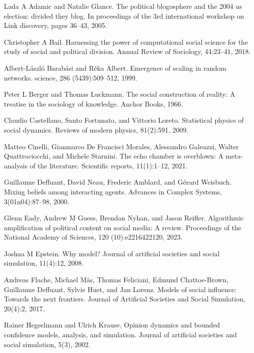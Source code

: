 \documentclass[11pt]{article}
\begin{document}
\begin{thebibliography}{23}

 Lada A Adamic and Natalie Glance. The political blogosphere and the 2004 us election: divided they blog. In proceedings of the 3rd international workshop on Link discovery, pages 36–43, 2005.

 Christopher A Bail. Harnessing the power of computational social science for the study of social and political division. Annual Review of Sociology, 44:23–41, 2018.

 Albert-L\'{a}szl\'{o} Barab\'{a}si and R\'{e}ka Albert. Emergence of scaling in random networks. science, 286 (5439):509–512, 1999.

 Peter L Berger and Thomas Luckmann. The social construction of reality: A treatise in the sociology of knowledge. Anchor Books, 1966.

 Claudio Castellano, Santo Fortunato, and Vittorio Loreto. Statistical physics of social dynamics. Reviews of modern physics, 81(2):591, 2009.

 Matteo Cinelli, Gianmarco De Francisci Morales, Alessandro Galeazzi, Walter Quattrociocchi, and Michele Starnini. The echo chamber is overblown: A meta-analysis of the literature. Scientific reports, 11(1):1–12, 2021.

 Guillaume Deffuant, David Neau, Frederic Amblard, and G\'{e}rard Weisbuch. Mixing beliefs among interacting agents. Advances in Complex Systems, 3(01n04):87–98, 2000.

 Glenn Eady, Andrew M Guess, Brendan Nyhan, and Jason Reifler. Algorithmic amplification of political content on social media: A review. Proceedings of the National Academy of Sciences, 120 (10):e2216422120, 2023.

 Joshua M Epstein. Why model? Journal of artificial societies and social simulation, 11(4):12, 2008.

 Andreas Flache, Michael M\"{a}s, Thomas Feliciani, Edmund Chattoe-Brown, Guillaume Deffuant, Sylvie Huet, and Jan Lorenz. Models of social influence: Towards the next frontiers. Journal of Artificial Societies and Social Simulation, 20(4):2, 2017.

 Rainer Hegselmann and Ulrich Krause. Opinion dynamics and bounded confidence models, analysis, and simulation. Journal of artificial societies and social simulation, 5(3), 2002.


\end{thebibliography}
\end{document}
